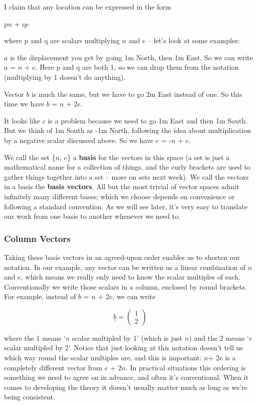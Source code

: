 \documentclass[oneside,english]{amsbook}
\numberwithin{section}{chapter}
\theoremstyle{plain}
\theoremstyle{definition}
\begin{document}
I claim that any location can be expressed in the form

p$n$ + q$e$

where p and q are scalars multiplying $n$ and $e$ -- let's look at
some examples:

$a$ is the displacement you get by going 1m North, then 1m East. So
we can write $a$ = $n$ + $e$. Here p and q are both 1, so we
can drop them from the notation (multiplying by 1 doesn't do anything).

Vector $b$ is much the same, but we have to go 2m East instead of
one. So this time we have $b$ = $n$ + 2$e$.

It looks like $c$ is a problem because we need to go 1m East and then
1m South. But we think of 1m South as -1m North, following the idea
about multiplication by a negative scalar discussed above. So we have
$c$ = -$n$ + $e$.

We call the set \{$n$, $e$\} a \textbf{basis} for the vectors in
this space (a set is just a mathematical name for a collection of
things, and the curly brackets are used to gather things together into a
set -- more on sets next week). We call the vectors in a basis the
\textbf{basis vectors}. All but the most trivial of vector spaces admit
infinitely many different bases; which we choose depends on convenience
or following a standard convention. As we will see later, it's very easy
to translate our work from one basis to another whenever we need to.

\subsubsection{Column Vectors}

Taking these basis vectors in an agreed-upon order enables us to shorten
our notation. In our example, any vector can be written as a linear
combination of $n$ and $e$, which means we really only need to
know the scalar multiples of each. Conventionally we write those scalars
in a column, enclosed by round brackets. For example, instead of $b$
= $n$ + 2$e$, we can write

\[\underline{b} = \begin{pmatrix}
	1 \\
	2
\end{pmatrix}\]

where the 1 means `$n$ scalar multipled by 1' (which is just
$n$) and the 2 means `$e$ scalar multipled by 2'. Notice that
just looking at this notation doesn't tell us which way round the scalar
multiples are, and this is important: $n$+ 2$e$ is a completely
different vector from $e$ + 2$n$. In practical situations this
ordering is something we need to agree on in advance, and often it's
conventional. When it comes to developing the theory it doesn't usually
matter much as long as we're being consistent.
\end{document}
